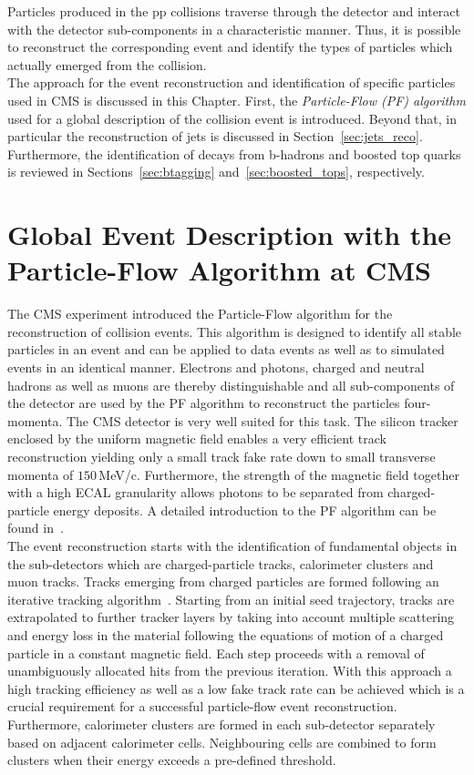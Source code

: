 Particles produced in the pp collisions traverse through the detector and interact with the detector sub-components in a characteristic manner. Thus, it is possible to reconstruct the corresponding event and identify the types of particles which actually emerged from the collision. \\
The approach for the event reconstruction and identification of specific particles used in CMS is discussed in this Chapter. First, the \textit{Particle-Flow (PF) algorithm} used for a global description of the collision event is introduced. Beyond that, in particular the reconstruction of jets is discussed in Section~\ref{sec:jets_reco}. Furthermore, the identification of decays from b-hadrons and boosted top quarks is reviewed in Sections~\ref{sec:btagging} and~\ref{sec:boosted_tops}, respectively.
\section{Global Event Description with the Particle-Flow Algorithm at CMS}
\label{sec:pf_algo}
The CMS experiment introduced the Particle-Flow algorithm for the reconstruction of collision events. This algorithm is designed to identify all stable particles in an event and can be applied to data events as well as to simulated events in an identical manner. Electrons and photons, charged and neutral hadrons as well as muons are thereby distinguishable and all sub-components of the detector are used by the PF algorithm to reconstruct the particles four-momenta. The CMS detector is very well suited for this task. The silicon tracker enclosed by the uniform magnetic field enables a very efficient track reconstruction yielding only a small track fake rate down to small transverse momenta of $150$\,MeV/c. Furthermore, the strength of the magnetic field together with a high ECAL granularity allows photons to be separated from charged-particle energy deposits. A detailed introduction to the PF algorithm can be found in~\cite{CMS-PAS-PFT-09-001}. \\ 
The event reconstruction starts with the identification of fundamental objects in the sub-detectors which are charged-particle tracks, calorimeter clusters and muon tracks. Tracks emerging from charged particles are formed following an iterative tracking algorithm~\cite{Adam:934067}. Starting from an initial seed trajectory, tracks are extrapolated to further tracker layers by taking into account multiple scattering and energy loss in the material following the equations of motion of a charged particle in a constant magnetic field. Each step proceeds with a removal of unambiguously allocated hits from the previous iteration. With this approach a high tracking efficiency as well as a low fake track rate can be achieved which is a crucial requirement for a successful particle-flow event reconstruction. Furthermore, calorimeter clusters are formed in each sub-detector separately based on adjacent calorimeter cells. Neighbouring cells are combined to form clusters when their energy exceeds a pre-defined threshold. \\
